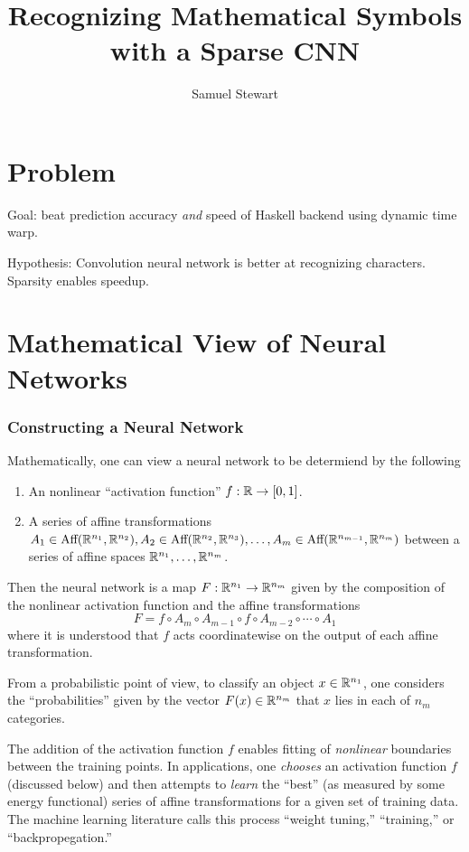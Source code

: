 \documentclass[12pt,letterpaper,boxed]{article}
\author{Samuel Stewart}
\title{Recognizing Mathematical Symbols with a Sparse CNN}
\begin{document}
\maketitle
\section{Problem}
	Goal: beat prediction accuracy \emph{and} speed of Haskell backend using dynamic time warp.

	Hypothesis: Convolution neural network is better at recognizing characters. Sparsity enables speedup.

\section{Mathematical View of Neural Networks}

	\subsubsection{Constructing a Neural Network}

	Mathematically, one can view a neural network to be determiend by the following
	\begin{enumerate}
		\item An nonlinear ``activation function'' $f : {\mathbb{R}} \to [0, 1]$.
		\item A series of affine transformations 
		$A_1 \in \textrm{Aff}({\mathbb{R}}^{n_1}, {\mathbb{R}}^{n_2}), A_2 \in \textrm{Aff}({\mathbb{R}}^{n_2}, {\mathbb{R}}^{n_3}), \ldots, A_m \in \textrm{Aff}({\mathbb{R}}^{n_{m - 1}}, {\mathbb{R}}^{n_m})$
		between a series of affine spaces ${\mathbb{R}}^{n_1}, \ldots, {\mathbb{R}}^{n_m}$.
	\end{enumerate}
	Then the neural network is a map $F : {\mathbb{R}}^{n_1} \to {\mathbb{R}}^{n_m}$ given by the composition of the nonlinear activation function and the affine transformations
	\[
		F = f \circ A_m \circ A_{m - 1} \circ f \circ A_{m - 2} \circ \cdots \circ A_1
	\]
	where it is understood that $f$ acts coordinatewise on the output of each affine transformation. 

	From a probabilistic point of view, to classify an object $x \in {\mathbb{R}}^{n_1}$, one considers the ``probabilities'' given by the vector $F(x) \in {\mathbb{R}}^{n_m}$ that $x$ lies in each of $n_m$ categories. 

	The addition of the activation function $f$ enables fitting of \textit{nonlinear} boundaries between the training points. In applications, one \textit{chooses} an activation function $f$ (discussed below) and then attempts to \textit{learn} the ``best'' (as measured by some energy functional) series of affine transformations for a given set of training data. The machine learning literature calls this process ``weight tuning,'' ``training,'' or ``backpropegation.''
\end{document}
